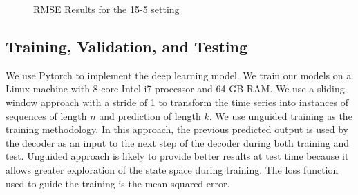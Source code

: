 \begin{figure}[!ht]
{       \label{4d}}
  \caption{RMSE Results for the 15-5 setting}
  \label{fig:qual_rmse} 
  \vspace{-3mm}
\end{figure}

 



\subsection{Training, Validation, and Testing}
\label{sec:train}

We use Pytorch to implement the deep learning model.   We train our models on a Linux machine with 8-core Intel i7 processor and 64 GB RAM.
We use a sliding window approach with a stride of 1 to transform the time series into instances of sequences of length $n$ and prediction of length $k$. We use unguided training as the training methodology.  In this approach, the previous predicted output is used by the decoder as an input to the next step of the decoder during both training and test. Unguided approach is likely to provide better results at test time because it allows greater exploration of the state space during training. The loss function used to guide the training is the mean squared error.

